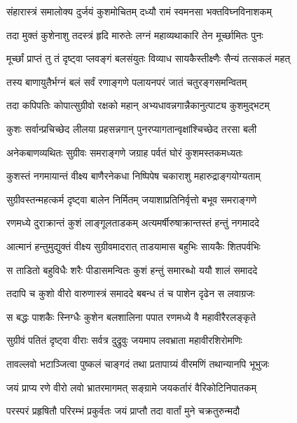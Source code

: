 \twolineshloka
{संहारास्त्रं समालोक्य दुर्जयं कुशमोचितम्}
{दध्यौ रामं स्वमनसा भक्तविघ्नविनाशकम्}%

\twolineshloka
{तदा मुक्तं कुशेनाशु तदस्त्रं हृदि मारुतेः}
{लग्नं महाव्यथाकारि तेन मूर्च्छामितः पुनः}%

\twolineshloka
{मूर्च्छां प्राप्तं तु तं दृष्ट्वा प्लवङ्गं बलसंयुतः}
{विव्याध सायकैस्तीक्ष्णैः सैन्यं तत्सकलं महत्}%

\twolineshloka
{तस्य बाणायुतैर्भग्नं बलं सर्वं रणाङ्गणे}
{पलायनपरं जातं चतुरङ्गसमन्वितम्}%

\twolineshloka
{तदा कपिपतिः कोपात्सुग्रीवो रक्षको महान्}
{अभ्यधावन्नगान्नैकानुत्पाट्य कुशमुद्भटम्}%

\twolineshloka
{कुशः सर्वान्प्रचिच्छेद लीलया प्रहसन्नगान्}
{पुनरप्यागतान्वृक्षांश्चिच्छेद तरसा बली}%

\twolineshloka
{अनेकबाणव्यथितः सुग्रीवः समराङ्गणे}
{जग्राह पर्वतं घोरं कुशमस्तकमध्यतः}%

\twolineshloka
{कुशस्तं नगमायान्तं वीक्ष्य बाणैरनेकधा}
{निष्पिपेष चकाराशु महारुद्राङ्गयोग्यताम्}%

\twolineshloka
{सुग्रीवस्तन्महत्कर्म दृष्ट्वा बालेन निर्मितम्}
{जयाशाप्रतिनिर्वृत्तो बभूव समराङ्गणे}%

\twolineshloka
{रणमध्ये दुराक्रान्तं कुशं लाङ्गूलताडकम्}
{अत्यमर्षीरुषाक्रान्तस्तं हन्तुं नगमाददे}%

\twolineshloka
{आत्मानं हन्तुमुद्युक्तं वीक्ष्य सुग्रीवमादरात्}
{ताडयामास बहुभिः सायकैः शितपर्वभिः}%

\twolineshloka
{स ताडितो बहुविधैः शरैः पीडासमन्वितः}
{कुशं हन्तुं समारब्धो ययौ शालं समाददे}%

\twolineshloka
{तदापि च कुशो वीरो वारुणास्त्रं समाददे}
{बबन्ध तं च पाशेन दृढेन स लवाग्रजः}%

\twolineshloka
{स बद्धः पाशकैः स्निग्धैः कुशेन बलशालिना}
{पपात रणमध्ये वै महावीरैरलङ्कृते}%

\twolineshloka
{सुग्रीवं पतितं दृष्ट्वा वीराः सर्वत्र दुद्रुवुः}
{जयमाप लवभ्राता महावीरशिरोमणिः}%

\twolineshloka
{तावल्लवो भटाञ्जित्वा पुष्कलं चाङ्गदं तथा}
{प्रतापाग्र्यं वीरमणिं तथान्यानपि भूभुजः}%

\twolineshloka
{जयं प्राप्य रणे वीरो लवो भ्रातरमागमत्}
{सङ्ग्रामे जयकर्तारं वैरिकोटिनिपातकम्}%

\twolineshloka
{परस्परं प्रहृषितौ परिरम्भं प्रकुर्वतः}
{जयं प्राप्तौ तदा वार्तां मुने चक्रतुरुन्मदौ}%


